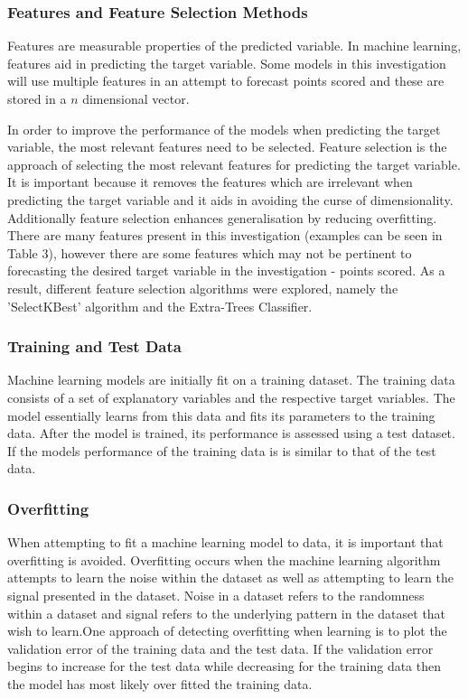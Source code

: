\documentclass[a4paper,11pt,twoside]{article}
\begin{document}
\subsubsection{Features and Feature Selection Methods}
Features are measurable properties of the predicted variable. In machine learning, features aid in predicting the target variable. Some models in this investigation will use multiple features in an attempt to forecast points scored and these are stored in a $n$ dimensional vector.

In order to improve the performance of the models when predicting the target variable, the most relevant features need to be selected. Feature selection is the approach of selecting the most relevant features for predicting the target variable. It is important because it removes the features which are irrelevant when predicting the target variable and it aids in avoiding the curse of dimensionality. Additionally feature selection enhances generalisation by reducing overfitting. There are many features present in this investigation (examples can be seen in Table 3), however there are some features which may not be pertinent to forecasting the desired target variable in the investigation - points scored. As a result, different feature selection algorithms were explored, namely the 'SelectKBest' algorithm and the Extra-Trees Classifier.

 \subsubsection{Training and Test Data}
Machine learning models are initially fit on a training dataset. The training data consists of a set of explanatory variables and the respective target variables. The model essentially learns from this data and fits its parameters to the training data. After the model is trained, its performance is assessed using a test dataset. If the models performance of the training data is is similar to that of the test data.

\subsubsection{Overfitting}
When attempting to fit a machine learning model to data, it is important that overfitting is avoided. Overfitting occurs when the machine learning algorithm attempts to learn the noise within the dataset as well as attempting to learn the signal presented in the dataset. Noise in a dataset refers to the randomness within a dataset and signal refers to the underlying pattern in the dataset that wish to learn.One approach of detecting overfitting when learning is to plot the validation error of the training data and the test data. If the validation error begins to increase for the test data while decreasing for the training data then the model has most likely over fitted the training data. 
\end{document}
